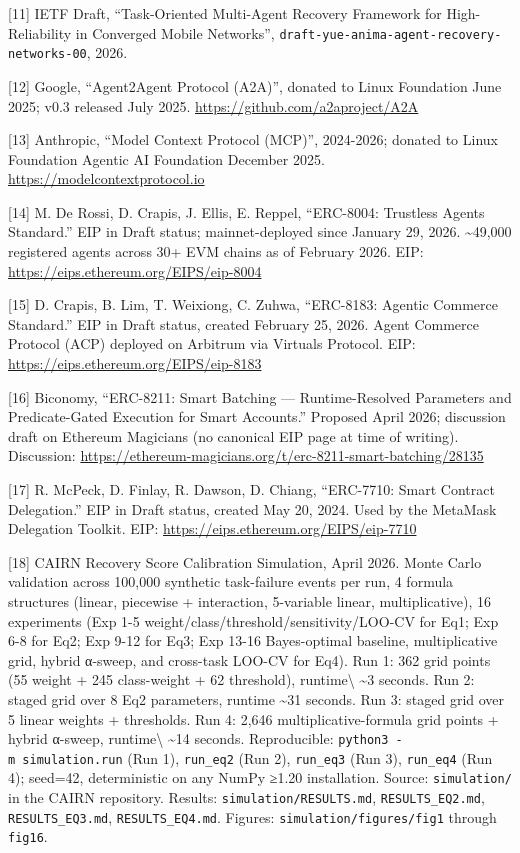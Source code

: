 \documentclass[
  10pt,
]{article}
\begin{document}
{[}11{]} IETF Draft, ``Task-Oriented Multi-Agent Recovery Framework for
High-Reliability in Converged Mobile Networks'',
\texttt{draft-yue-anima-agent-recovery-networks-00}, 2026.

{[}12{]} Google, ``Agent2Agent Protocol (A2A)'', donated to Linux
Foundation June 2025; v0.3 released July 2025.
\url{https://github.com/a2aproject/A2A}

{[}13{]} Anthropic, ``Model Context Protocol (MCP)'', 2024-2026; donated
to Linux Foundation Agentic AI Foundation December 2025.
\url{https://modelcontextprotocol.io}

{[}14{]} M. De Rossi, D. Crapis, J. Ellis, E. Reppel, ``ERC-8004:
Trustless Agents Standard.'' EIP in Draft status; mainnet-deployed since
January 29, 2026. \textasciitilde49,000 registered agents across 30+ EVM
chains as of February 2026. EIP:
\url{https://eips.ethereum.org/EIPS/eip-8004}

{[}15{]} D. Crapis, B. Lim, T. Weixiong, C. Zuhwa, ``ERC-8183: Agentic
Commerce Standard.'' EIP in Draft status, created February 25, 2026.
Agent Commerce Protocol (ACP) deployed on Arbitrum via Virtuals
Protocol. EIP: \url{https://eips.ethereum.org/EIPS/eip-8183}

{[}16{]} Biconomy, ``ERC-8211: Smart Batching --- Runtime-Resolved
Parameters and Predicate-Gated Execution for Smart Accounts.'' Proposed
April 2026; discussion draft on Ethereum Magicians (no canonical EIP
page at time of writing). Discussion:
\url{https://ethereum-magicians.org/t/erc-8211-smart-batching/28135}

{[}17{]} R. McPeck, D. Finlay, R. Dawson, D. Chiang, ``ERC-7710: Smart
Contract Delegation.'' EIP in Draft status, created May 20, 2024. Used
by the MetaMask Delegation Toolkit. EIP:
\url{https://eips.ethereum.org/EIPS/eip-7710}

{[}18{]} CAIRN Recovery Score Calibration Simulation, April 2026. Monte
Carlo validation across 100,000 synthetic task-failure events per run, 4
formula structures (linear, piecewise + interaction, 5-variable linear,
multiplicative), 16 experiments (Exp 1-5
weight/class/threshold/sensitivity/LOO-CV for Eq1; Exp 6-8 for Eq2; Exp
9-12 for Eq3; Exp 13-16 Bayes-optimal baseline, multiplicative grid,
hybrid α-sweep, and cross-task LOO-CV for Eq4). Run 1: 362 grid points
(55 weight + 245 class-weight + 62 threshold), runtime\textbackslash{}
\textasciitilde3 seconds. Run 2: staged grid over 8 Eq2 parameters,
runtime \textasciitilde31 seconds. Run 3: staged grid over 5 linear
weights + thresholds. Run 4: 2,646 multiplicative-formula grid points +
hybrid α-sweep, runtime\textbackslash{} \textasciitilde14 seconds.
Reproducible: \texttt{python3\ -m\ simulation.run} (Run 1),
\texttt{run\_eq2} (Run 2), \texttt{run\_eq3} (Run 3), \texttt{run\_eq4}
(Run 4); seed=42, deterministic on any NumPy ≥1.20 installation. Source:
\texttt{simulation/} in the CAIRN repository. Results:
\texttt{simulation/RESULTS.md}, \texttt{RESULTS\_EQ2.md},
\texttt{RESULTS\_EQ3.md}, \texttt{RESULTS\_EQ4.md}. Figures:
\texttt{simulation/figures/fig1} through \texttt{fig16}.
\end{document}

